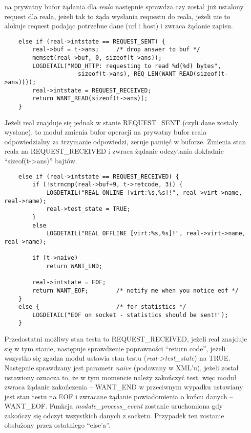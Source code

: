 \documentclass[polish,12pt]{article}
\begin{document}
na prywatny bufor żądania dla \textit{reala} następnie sprawdza czy został już ustalony request dla reala,
jeżeli tak to żąda wysłania requestu do reala, jeżeli nie to alokuje request podając potrzebne dane (url i host)
i zwraca żądanie zapisu.
\newline
{\small
\begin{verbatim}
    else if (real->intstate == REQUEST_SENT) {
        real->buf = t->ans;     /* drop answer to buf */
        memset(real->buf, 0, sizeof(t->ans));
        LOGDETAIL("MOD_HTTP: requesting to read %d(%d) bytes",
                     sizeof(t->ans), REQ_LEN(WANT_READ(sizeof(t->ans))));
        real->intstate = REQUEST_RECEIVED;
        return WANT_READ(sizeof(t->ans));
    }
\end{verbatim}
}
Jeżeli real znajduje się jednak w stanie REQUEST\_SENT (czyli dane zostały wysłane), to moduł zmienia bufor operacji
na prywatny bufor reala odpowiedzialny za trzymanie odpowiedzi, zeruje pamięć w buforze.
Zmienia stan reala na REQUEST\_RECEIVED i zwraca żądanie odczytania dokładnie ``sizeof(t->ans)'' bajtów.
\newpage
{\small
\begin{verbatim}
    else if (real->intstate == REQUEST_RECEIVED) {
        if (!strncmp(real->buf+9, t->retcode, 3)) {
            LOGDETAIL("REAL ONLINE [virt:%s,%s]!", real->virt->name, real->name);
            real->test_state = TRUE;
        }
        else
            LOGDETAIL("REAL OFFLINE [virt:%s,%s]!", real->virt->name, real->name);

        if (t->naive)
            return WANT_END;

        real->intstate = EOF;
        return WANT_EOF;        /* notify me when you notice eof */
    }
    else {                      /* for statistics */
        LOGDETAIL("EOF on socket - statistics should be sent!");
    }
\end{verbatim}
}
Przedostatni możliwy stan testu to REQUEST\_RECEIVED, jeżeli real znajduje się w tym stanie,
następuje sprawdzenie poprawności ``return code'', jeżeli wszystko się zgadza moduł ustawia
stan testu (\textit{real->test\_state}) na TRUE. \newline
Następnie sprawdzany jest parametr \textit{naive} (podawany w XML'u), jeżeli został ustawiony
oznacza to, że w tym momencie należy zakończyć test, więc moduł zwraca żądanie zakończenia -- WANT\_END
w przeciwnym wypadku ustawiany jest stan testu na EOF i zwracane żądanie powiadomienia o końcu danych -- WANT\_EOF.
Funkcja \textit{module\_process\_event} zostanie uruchomiona gdy zakończy się odczyt wszystkich danych z socketu.
Przypadek ten zostanie obsłużony przez ostatniego ``else'a''.
\end{document}
